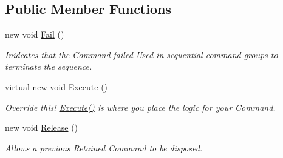 \subsection*{Public Member Functions}
\begin{DoxyCompactItemize}
\item 
\hypertarget{classstrange_1_1extensions_1_1sequencer_1_1impl_1_1_sequence_command_a338497a5f3812ed4b115cf222f372b9e}{new void \hyperlink{classstrange_1_1extensions_1_1sequencer_1_1impl_1_1_sequence_command_a338497a5f3812ed4b115cf222f372b9e}{Fail} ()}\label{classstrange_1_1extensions_1_1sequencer_1_1impl_1_1_sequence_command_a338497a5f3812ed4b115cf222f372b9e}

\begin{DoxyCompactList}\small\item\em Inidcates that the Command failed Used in sequential command groups to terminate the sequence. \end{DoxyCompactList}\item 
\hypertarget{classstrange_1_1extensions_1_1sequencer_1_1impl_1_1_sequence_command_a570b3772279bc89be06d7377a6c0827b}{virtual new void \hyperlink{classstrange_1_1extensions_1_1sequencer_1_1impl_1_1_sequence_command_a570b3772279bc89be06d7377a6c0827b}{Execute} ()}\label{classstrange_1_1extensions_1_1sequencer_1_1impl_1_1_sequence_command_a570b3772279bc89be06d7377a6c0827b}

\begin{DoxyCompactList}\small\item\em Override this! {\ttfamily \hyperlink{classstrange_1_1extensions_1_1sequencer_1_1impl_1_1_sequence_command_a570b3772279bc89be06d7377a6c0827b}{Execute()}} is where you place the logic for your Command. \end{DoxyCompactList}\item 
\hypertarget{classstrange_1_1extensions_1_1sequencer_1_1impl_1_1_sequence_command_a3701cfea169824248179b71f4117c791}{new void \hyperlink{classstrange_1_1extensions_1_1sequencer_1_1impl_1_1_sequence_command_a3701cfea169824248179b71f4117c791}{Release} ()}\label{classstrange_1_1extensions_1_1sequencer_1_1impl_1_1_sequence_command_a3701cfea169824248179b71f4117c791}

\begin{DoxyCompactList}\small\item\em Allows a previous Retained Command to be disposed. \end{DoxyCompactList}\end{DoxyCompactItemize}
